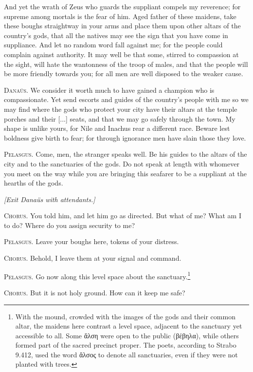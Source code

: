 \documentclass[12pt]{article}
\begin{document}
And yet the wrath of Zeus who guards the suppliant compels my reverence; for supreme among mortals is the fear of him. Aged father of these maidens, take these boughs straightway in your arms and place them upon other altars of the country's gods, that all the natives may see the sign that you have come in suppliance. And let no random word fall against me; for the people could complain against authority. It may well be that some, stirred to compassion at the sight, will hate the wantonness of the troop of males, and that the people will be more friendly towards you; for all men are well disposed to the weaker cause.

\textsc{Dana\"{u}s.} We consider it worth much to have gained a champion who is compassionate. Yet send escorts and guides of the country's people with me so we may find where the gods who protect your city have their altars at the temple porches and their [...] seats, and that we may go safely through the town. My shape is unlike yours, for Nile and Inachus rear a different race. Beware lest boldness give birth to fear; for through ignorance men have slain those they love.

\textsc{Pelasgus.} Come, men, the stranger speaks well. Be his guides to the altars of the city and to the sanctuaries of the gods. Do not speak at length with whomever you meet on the way while you are bringing this seafarer to be a suppliant at the hearths of the gods.

\begin{center}
\textit{[Exit Dana\"{u}s with attendants.]}
\end{center}

\textsc{Chorus.} You told him, and let him go as directed. But what of me? What am I to do? Where do you assign security to me?

\textsc{Pelasgus.} Leave your boughs here, tokens of your distress.

\textsc{Chorus.} Behold, I leave them at your signal and command.

\textsc{Pelasgus.} Go now along this level space about the sanctuary.\footnote{With the mound, crowded with the images of the gods and their common altar, the maidens here contrast a level space, adjacent to the sanctuary yet accessible to all. Some ἄλση were open to the public (βέβηλα), while others formed part of the sacred precinct proper. The poets, according to Strabo 9.412, used the word ἄλσος to denote all sanctuaries, even if they were not planted with trees.}

\textsc{Chorus.} But it is not holy ground. How can it keep me safe?
\end{document}
